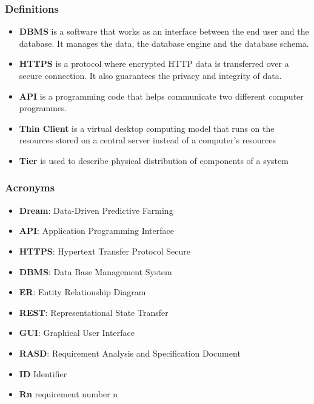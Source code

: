 \subsubsection{Definitions}
\begin{itemize}
        \item \textbf{DBMS} is a software that works as an interface between the end user and the database. It manages the data, the database engine and the database schema.
        \item \textbf{HTTPS} is a protocol where encrypted HTTP data is transferred over a secure connection. It also guarantees the privacy and integrity of data.
        \item \textbf{API} is a programming code that helps communicate two different computer programmes.
        \item \textbf{Thin Client} is a virtual desktop computing model that runs on the resources stored on a central server instead of a computer's resources
        \item \textbf{Tier} is used to describe physical distribution of components of a system
\end{itemize}
\subsubsection{Acronyms}
\begin{itemize}
        \item \textbf{Dream}: Data-Driven Predictive Farming
        \item \textbf{API}: Application Programming Interface
        \item \textbf{HTTPS}: Hypertext Transfer Protocol Secure
        \item \textbf{DBMS}: Data Base Management System
        \item \textbf{ER}: Entity Relationship Diagram
        \item \textbf{REST}: Representational State Transfer
        \item \textbf{GUI}: Graphical User Interface
        \item \textbf{RASD}: Requirement Analysis and Specification Document
\end{itemize}
\begin{itemize}
    \item \textbf{ID} Identifier
    \item \textbf{Rn} requirement number n
\end{itemize}

